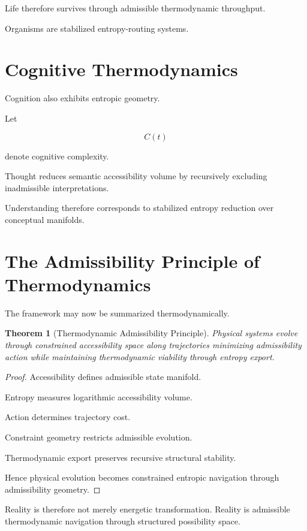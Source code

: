 \documentclass[12pt,openany]{book}
\theoremstyle{plain}
\newtheorem{theorem}{Theorem}[chapter]
\theoremstyle{definition}
\theoremstyle{remark}
\begin{document}
Life therefore survives through admissible thermodynamic
throughput.

Organisms are stabilized entropy-routing systems.

\section{Cognitive Thermodynamics}

Cognition also exhibits entropic geometry.

Let

\[
C(t)
\]

denote cognitive complexity.

Thought reduces semantic accessibility volume by recursively
excluding inadmissible interpretations.

Understanding therefore corresponds to stabilized entropy
reduction over conceptual manifolds.

\section{The Admissibility Principle of Thermodynamics}

The framework may now be summarized thermodynamically.

\begin{theorem}[Thermodynamic Admissibility Principle]
Physical systems evolve through constrained accessibility space
along trajectories minimizing admissibility action while
maintaining thermodynamic viability through entropy export.
\end{theorem}

\begin{proof}
Accessibility defines admissible state manifold.

Entropy measures logarithmic accessibility volume.

Action determines trajectory cost.

Constraint geometry restricts admissible evolution.

Thermodynamic export preserves recursive structural stability.

Hence physical evolution becomes constrained entropic navigation
through admissibility geometry.
\end{proof}

Reality is therefore not merely energetic transformation. Reality is admissible thermodynamic navigation through structured
possibility space.

\newpage
\end{document}
